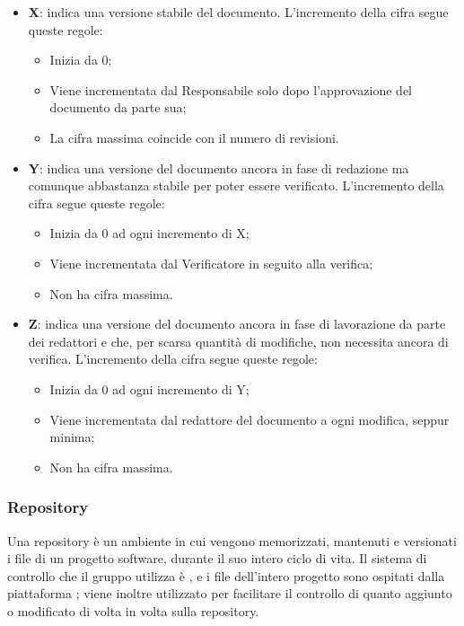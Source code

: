 \documentclass[../norme-di-progetto.tex]{subfiles}
\begin{document}
\begin{itemize}
  \item \textbf{X}: indica una versione stabile del documento. L'incremento della cifra segue queste regole:
  \begin{itemize}
    \item Inizia da 0;
    \item Viene incrementata dal Responsabile solo dopo l'approvazione del documento da parte sua;
    \item La cifra massima coincide con il numero di revisioni.
  \end{itemize}
  \item \textbf{Y}: indica una versione del documento ancora in fase di redazione ma comunque abbastanza stabile per poter essere verificato. L'incremento della cifra segue queste regole:
  \begin{itemize}
    \item Inizia da 0 ad ogni incremento di X;
    \item Viene incrementata dal Verificatore in seguito alla verifica;
    \item Non ha cifra massima.
  \end{itemize}
  \item \textbf{Z}: indica una versione del documento ancora in fase di lavorazione da parte dei redattori e che, per scarsa quantità di modifiche, non necessita ancora di verifica. L'incremento della cifra segue queste regole:
  \begin{itemize}
    \item Inizia da 0 ad ogni incremento di Y;
    \item Viene incrementata dal redattore del documento a ogni modifica, seppur minima;
    \item Non ha cifra massima.
  \end{itemize}
\end{itemize}

\subsubsection{Repository}
Una repository è un ambiente in cui vengono memorizzati, mantenuti e versionati i file di un progetto software, durante il suo intero ciclo di vita. Il sistema di controllo che il gruppo utilizza è , e i file dell'intero progetto sono ospitati dalla piattaforma ; viene inoltre utilizzato  per facilitare il controllo di quanto aggiunto o modificato di volta in volta sulla repository.
\end{document}
